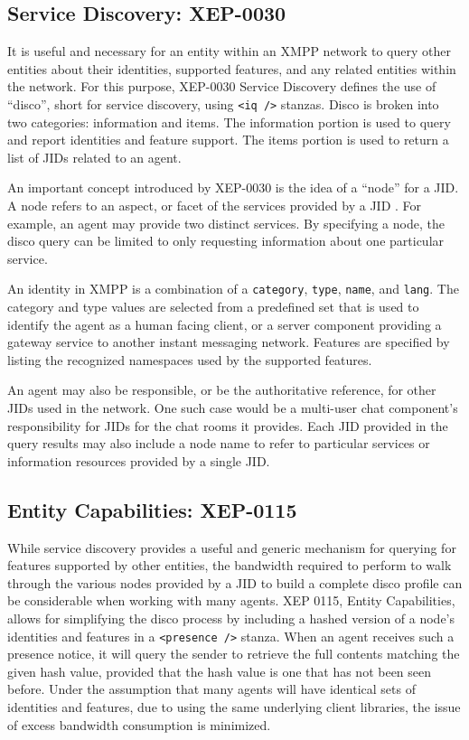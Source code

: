 \subsection{Service Discovery: XEP-0030}
\label{sec:Service-Discovery}

It is useful and necessary for an entity within an XMPP network to query other
entities about their identities, supported features, and any related entities
within the network. For this purpose, XEP-0030 Service Discovery \cite{XEP-0030}
defines the use of ``disco'', short for service discovery, using \texttt{<iq />}
stanzas. Disco is broken into two categories: information and items. The information
portion is used to query and report identities and feature support. The items portion
is used to return a list of JIDs related to an agent.

An important concept introduced by XEP-0030 is the idea of a ``node'' for a JID. A node
refers to an aspect, or facet of the services provided by a JID \cite{XEP-0030}. For
example, an agent may provide two distinct services. By specifying a node, the disco
query can be limited to only requesting information about one particular service.

An identity in XMPP is a combination of a \texttt{category}, \texttt{type}, \texttt{name}, and
\texttt{lang}. The category and type values are selected from a predefined set that is used
to identify the agent as a human facing client, or a server component providing a gateway
service to another instant messaging network. Features are specified by listing the 
recognized namespaces used by the supported features.

An agent may also be responsible, or be the authoritative reference, for other JIDs used
in the network. One such case would be a multi-user chat component's responsibility for
JIDs for the chat rooms it provides. Each JID provided in the query results may also 
include a node name to refer to particular services or information resources provided
by a single JID.

\subsection{Entity Capabilities: XEP-0115}
\label{sec:Entity-Capabilities}

While service discovery provides a useful and generic mechanism for querying
for features supported by other entities, the bandwidth required to perform
to walk through the various nodes provided by a JID to build a complete disco
profile can be considerable when working with many agents. XEP 0115, Entity
Capabilities, allows for simplifying the disco process by including a hashed
version of a node's identities and features in a \texttt{<presence />} stanza.
When an agent receives such a presence notice, it will query the sender to
retrieve the full contents matching the given hash value, provided that the
hash value is one that has not been seen before. Under the assumption that many
agents will have identical sets of identities and features, due to using the
same underlying client libraries, the issue of excess bandwidth consumption is
minimized.

